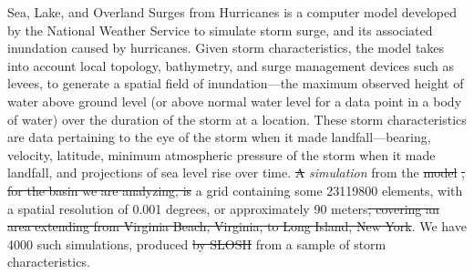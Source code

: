 Sea, Lake, and Overland Surges from Hurricanes \citep{jelesnianski1992} is a 
    computer model developed by the National Weather Service to simulate storm 
    surge, and its associated inundation caused by hurricanes.   Given storm 
    characteristics, the model takes into account local topology, bathymetry, 
    and surge management devices such as levees, to generate a spatial field of 
    inundation---the maximum observed height of water above ground level 
    (or above normal water level for a data point in a body of water) over the 
    duration of the storm at a location.   These storm characteristics are
    data pertaining to the eye of the storm when it made landfall---bearing, 
    velocity, latitude, minimum atmospheric pressure of the storm when it 
    made landfall, and projections of sea level rise over time.  \st{A} 
    \emph{simulation} from the \st{model} \st{, for the basin we are analyzing, is}
    a grid 
    containing some \num{23119800} elements, with a spatial resolution of 
    \num{0.001} degrees, or approximately 90 meters\st{, covering an area extending 
    from Virginia Beach, Virginia, to Long Island, New York}.
    We have \num{4000} such simulations, produced \st{by SLOSH} from a sample of 
    storm characteristics. 

